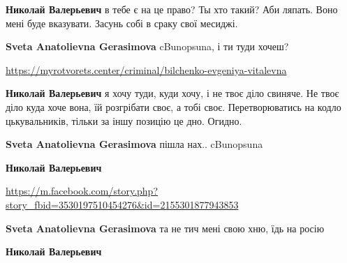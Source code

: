 \begin{itemize}

\textbf{Николай Валерьевич} в тебе є на це право? Ты хто такий? Аби ляпать. Воно мені буде вказувати. Засунь собі в сраку свої месиджі.


\textbf{Sveta Anatolievna Gerasimova} cBunopsuna, і ти туди хочеш?

\url{https://myrotvorets.center/criminal/bilchenko-evgeniya-vitalevna}


\textbf{Николай Валерьевич} я хочу туди, куди хочу, і не твоє діло свиняче. Не твоє діло куда хоче вона, їй розгрібати своє, а тобі своє. Перетворюватись на кодло цькувальників, тільки за іншу позицію це дно. Огидно.


\textbf{Sveta Anatolievna Gerasimova} пішла нах.. cBunopsuna


\textbf{Николай Валерьевич} 

\url{https://m.facebook.com/story.php?story_fbid=3530197510454276&id=2155301877943853}


\textbf{Sveta Anatolievna Gerasimova} та не тич мені свою хню, їдь на росію


\textbf{Николай Валерьевич} 


\end{itemize}
